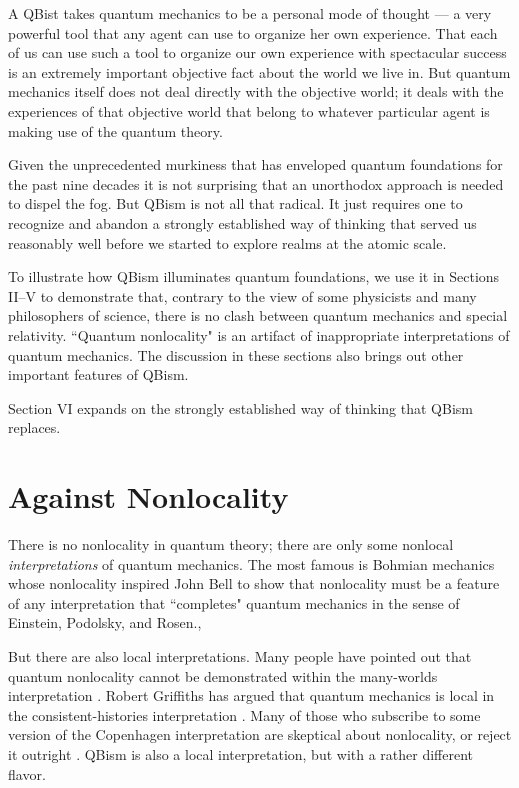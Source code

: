 \documentclass[aps,prb,superscriptaddress,12pt,tightenlines,nofootinbib]{revtex4-2}
\begin{document}
A QBist takes quantum mechanics to be  a personal mode of thought --- a very powerful tool that any agent can use to organize  her own experience.   That each of us can use such a tool to organize our own experience  with spectacular success is an extremely important  objective fact about the world we live in.   But quantum mechanics itself does not deal directly with the objective world; it  deals with the experiences of that objective world that belong to whatever particular agent is making use of the quantum theory.

Given the unprecedented murkiness that has enveloped quantum foundations for the past nine decades it is not surprising that an unorthodox approach is needed to dispel the fog.   But QBism is not all that radical.  It just requires one to recognize and abandon a strongly established way of thinking that served us reasonably well before we started to explore realms at the atomic scale.

To illustrate how QBism illuminates quantum foundations, we use it in Sections II--V to demonstrate that, contrary to the view of some physicists and many philosophers of science, there is no clash between quantum mechanics and special relativity.   ``Quantum nonlocality" is an artifact of inappropriate interpretations of quantum mechanics.   The discussion in these sections also brings out other important features of QBism.

Section VI expands on the strongly established way of thinking that QBism replaces.


\section{Against Nonlocality}

There is no nonlocality in quantum theory;  there are only some nonlocal {\it interpretations\/} of quantum mechanics.
The most famous is Bohm\-ian mechanics \cite{Bohm52} whose nonlocality  inspired John Bell to show that nonlocality must be a feature of any interpretation that ``completes" quantum mechanics in the sense of Einstein, Podolsky, and Rosen.,

But there are also local interpretations.  Many people have pointed out that quantum nonlocality cannot be demonstrated within the many-worlds interpretation \cite{DeutschHayden,Tipler00,Bacciagaluppi02}.   Robert Griffiths has argued that quantum mechanics is local in the consistent-histories interpretation \cite{Griffiths11}.  Many of those who subscribe to some version of the Copenhagen interpretation are skeptical about nonlocality, or reject it outright \cite{Peres04,Englert13}.
QBism is also a local interpretation, but with a rather different flavor.
\end{document}
